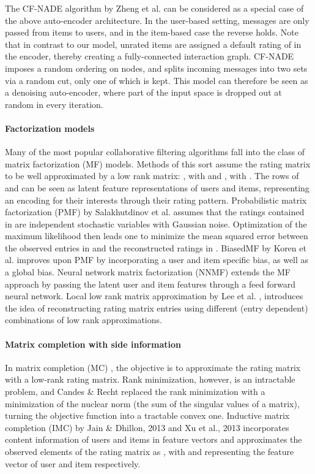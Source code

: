 \documentclass[twoside]{article}
\begin{document}
The CF-NADE algorithm by Zheng et al. \cite{zheng2016neural} can be considered as a special case of the above auto-encoder architecture. In the user-based setting, messages are only passed from items to users, and in the item-based case the reverse holds. Note that in contrast to our model, unrated items are assigned a default rating of  in the encoder, thereby creating a fully-connected interaction graph. CF-NADE imposes a random ordering on nodes, and splits incoming messages into two sets via a random cut, only one of which is kept. This model can therefore be seen as a denoising auto-encoder, where part of the input space is dropped out at random in every iteration.

\paragraph{Factorization models}
Many of the most popular collaborative filtering algorithms fall into the class of matrix factorization (MF) models. Methods of this sort assume the rating matrix to be well approximated by a low rank matrix: , with  and , with . The rows of  and  can be seen as latent feature representations of users and items, representing an encoding for their interests through their rating pattern. Probabilistic matrix factorization (PMF) by Salakhutdinov et al. \cite{salakhutdinov2007probabilistic} assumes that the ratings contained in  are independent stochastic variables with Gaussian noise. Optimization of the maximum likelihood then leads one to minimize the mean squared error between the observed entries in  and the reconstructed ratings in . BiasedMF by Koren et al. \cite{Koren2009matrix} improves upon PMF by incorporating a user and item specific bias, as well as a global bias. Neural network matrix factorization (NNMF) \cite{dziugaite2015neural} extends the MF approach by passing the latent user and item features through a feed forward neural network. Local low rank matrix approximation by Lee et al. \cite{lee2013local}, introduces the idea of reconstructing rating matrix entries using different (entry dependent) combinations of low rank approximations.

\paragraph{Matrix completion with side information}
In matrix completion (MC) \cite{candes2012exact}, the objective is to approximate the rating matrix with a low-rank rating matrix. Rank minimization, however, is an intractable problem, and Candes \& Recht \cite{candes2012exact} replaced the rank minimization with a minimization of the nuclear norm (the sum of the singular values of a matrix), turning the objective function into a tractable convex one. Inductive matrix completion (IMC) by Jain \& Dhillon, 2013 and Xu et al., 2013 
incorporates content information of users and items in feature vectors and approximates the observed elements of the rating matrix as , with  and  representing the feature vector of user  and item  respectively. 
\end{document}
